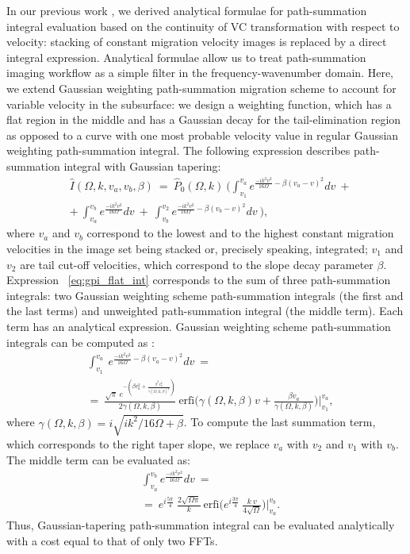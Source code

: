 In our previous work \cite[]{merzlikin17}, we derived analytical formulae
for path-summation integral evaluation based on the continuity of VC transformation with respect
to velocity: stacking of constant migration velocity images
is replaced by a direct integral expression. Analytical formulae
allow us to treat path-summation imaging workflow as a simple
filter in the frequency-wavenumber domain. Here, we extend Gaussian weighting path-summation migration scheme
\cite[]{merzlikin17} to account for variable velocity in the subsurface:
we design a weighting function, which has a flat region in the middle and has a
Gaussian decay for the tail-elimination region as opposed
to a curve with one most probable velocity value in regular
Gaussian weighting path-summation integral. The following expression describes path-summation integral with Gaussian tapering:
\begin{align}
\label{eq:gpi_flat_int}
&\hat{I}(\Omega,k,v_a,v_b,\beta)\ =\ \hat{P}_0(\Omega,k)\ \Big( \int^{v_a}_{v_1} e^{\frac{-i k^2 v^2}{16\Omega} - \beta(v_{a} - v)^2} dv\ +\\ \nonumber
&+\ \int^{v_b}_{v_a}e^{\frac{-i k^2 v^2}{16\Omega}} dv\ +\ \int^{v_2}_{v_b} e^{\frac{-i k^2 v^2}{16\Omega} - \beta(v_{b} - v)^2} dv\ \Big),
\end{align}
where $v_a$ and $v_b$ correspond to the lowest and to the highest constant migration
velocities in the image set being stacked or, precisely speaking, integrated; $v_1$ and $v_2$ are
tail cut-off velocities, which correspond to the slope decay parameter $\beta$. Expression ~\ref{eq:gpi_flat_int} 
corresponds to the sum of three path-summation integrals: two Gaussian weighting scheme path-summation integrals (the first and
the last terms) and unweighted path-summation integral (the middle term).
Each term has an analytical expression.
Gaussian weighting scheme path-summation integrals can be computed as \cite[]{merzlikin17}:
\begin{align}
\label{eq:gpi_filt}
&\int^{v_a}_{v_1}\ e^{\frac{-i k^2 v^2}{16\Omega} - \beta(v_{a} - v)^2} dv\ = \\ \nonumber
&=\ \frac{\sqrt{\pi}\ e^{-(\beta v_{a}^2 + \frac{\beta^2 v_{a}^2}{\gamma(\Omega,k,\beta)^2})}}{ 2\gamma(\Omega,k,\beta) }\ \mbox{erfi}\big( \gamma(\Omega,k,\beta) v + \frac{\beta v_{a}}{\gamma(\Omega,k,\beta)} \big) \bigg|_{v_1}^{v_a}, 
\end{align}
where $\gamma(\Omega,k,\beta)=i\sqrt{ik^2/16\Omega + \beta}$. To compute the last summation term,
which corresponds to the right taper slope, we
replace $v_a$ with $v_2$ and $v_1$ with $v_b$. The middle term can be evaluated as:
\begin{align}
\label{eq:upi_filt}
&\int^{v_b}_{v_a}e^{\frac{-i k^2 v^2}{16\Omega}} dv\ =\\ \nonumber
&=\ e^{i\frac{5\pi}{4}}\ \frac{2\sqrt{\Omega \pi}}{k}\ \mbox{erfi}\big(e^{i\frac{3\pi}{4}}\ \frac{k\ v}{4\sqrt{\Omega}}\big) \bigg|_{v_a}^{v_b}. 
\end{align}
Thus, Gaussian-tapering path-summation integral can be evaluated analytically with a cost equal to that of only two FFTs.

